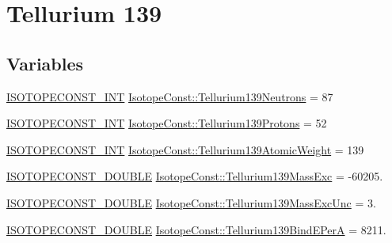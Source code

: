 \hypertarget{group___isotope_const-_tellurium-_te139}{}\section{Tellurium 139}
\label{group___isotope_const-_tellurium-_te139}
\subsection*{Variables}
\begin{DoxyCompactItemize}
\item 
\mbox{\hyperlink{group___isotope_const-_macros_ga5f18360b3e99483a35c32d789e62621c}{I\+S\+O\+T\+O\+P\+E\+C\+O\+N\+S\+T\+\_\+\+I\+NT}} \mbox{\hyperlink{group___isotope_const-_tellurium-_te139_ga14889146547229cd3c5ed4d8438eeb72}{Isotope\+Const\+::\+Tellurium139\+Neutrons}} = 87
\item 
\mbox{\hyperlink{group___isotope_const-_macros_ga5f18360b3e99483a35c32d789e62621c}{I\+S\+O\+T\+O\+P\+E\+C\+O\+N\+S\+T\+\_\+\+I\+NT}} \mbox{\hyperlink{group___isotope_const-_tellurium-_te139_gadfbfaba3661bfaf025f2e435c298d641}{Isotope\+Const\+::\+Tellurium139\+Protons}} = 52
\item 
\mbox{\hyperlink{group___isotope_const-_macros_ga5f18360b3e99483a35c32d789e62621c}{I\+S\+O\+T\+O\+P\+E\+C\+O\+N\+S\+T\+\_\+\+I\+NT}} \mbox{\hyperlink{group___isotope_const-_tellurium-_te139_ga357bad17ccd972564165f323b9dec8a6}{Isotope\+Const\+::\+Tellurium139\+Atomic\+Weight}} = 139
\item 
\mbox{\hyperlink{group___isotope_const-_macros_ga8f45a7272ce02c0b4c65c44636ed719a}{I\+S\+O\+T\+O\+P\+E\+C\+O\+N\+S\+T\+\_\+\+D\+O\+U\+B\+LE}} \mbox{\hyperlink{group___isotope_const-_tellurium-_te139_ga5cbce8ebedb6255108633792cde1a8ce}{Isotope\+Const\+::\+Tellurium139\+Mass\+Exc}} = -\/60205.
\item 
\mbox{\hyperlink{group___isotope_const-_macros_ga8f45a7272ce02c0b4c65c44636ed719a}{I\+S\+O\+T\+O\+P\+E\+C\+O\+N\+S\+T\+\_\+\+D\+O\+U\+B\+LE}} \mbox{\hyperlink{group___isotope_const-_tellurium-_te139_ga22672316e227d9b2d923251e634d2ebb}{Isotope\+Const\+::\+Tellurium139\+Mass\+Exc\+Unc}} = 3.
\item 
\mbox{\hyperlink{group___isotope_const-_macros_ga8f45a7272ce02c0b4c65c44636ed719a}{I\+S\+O\+T\+O\+P\+E\+C\+O\+N\+S\+T\+\_\+\+D\+O\+U\+B\+LE}} \mbox{\hyperlink{group___isotope_const-_tellurium-_te139_ga7dc185d90bf03c04adb492ff4744d716}{Isotope\+Const\+::\+Tellurium139\+Bind\+E\+PerA}} = 8211.
\item 

\end{DoxyCompactItemize}
